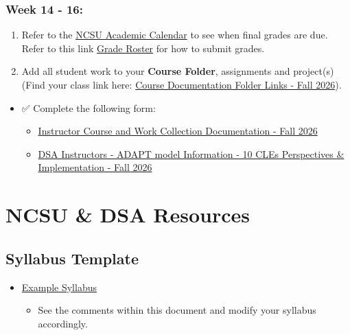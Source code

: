 \documentclass[
  letterpaper,
  DIV=11,
  numbers=noendperiod]{scrreprt}
\providecommand{\tightlist}{%
  \setlength{\itemsep}{0pt}\setlength{\parskip}{0pt}}
\begin{document}
\subsection{Week 14 - 16:}\label{week-14---16}

\begin{enumerate}
\def\labelenumi{\arabic{enumi})}
\item
  Refer to the
  \href{https://studentservices.ncsu.edu/calendars/academic/}{NCSU
  Academic Calendar} to see when final grades are due. Refer to this
  link
  \href{https://sis.emas.ncsu.edu/faculty/faculty-center/\#grades}{Grade
  Roster} for how to submit grades.
\item
  Add all student work to your \textbf{Course Folder}, assignments and
  project(s) (Find your class link here:
  \href{https://docs.google.com/spreadsheets/d/1BfmKDDVHphxg9P5aBqG5MKlu0ZaOudI4i4zswpZXQI0/edit?usp=sharing}{Course
  Documentation Folder Links - Fall 2026}).
\end{enumerate}

\begin{itemize}
\tightlist
\item
  ✅ Complete the following form:

  \begin{itemize}
  \tightlist
  \item
    \href{https://forms.gle/EZbAB9R8btpNZC5V6}{Instructor Course and
    Work Collection Documentation - Fall 2026}
  \item
    \href{https://forms.gle/ZEv9MpUCY2YeDwxn7}{DSA Instructors - ADAPT
    model Information - 10 CLEs Perspectives \& Implementation - Fall
    2026}
  \end{itemize}
\end{itemize}


\chapter{NCSU \& DSA Resources}\label{ncsu-dsa-resources}

\section{Syllabus Template}\label{syllabus-template}

\begin{itemize}
\tightlist
\item
  \href{https://docs.google.com/document/d/12w-byO3kEmP4ofI8GIuDAbXkEOA3hwqVGXz3qRbX-l4/edit?usp=sharing}{Example
  Syllabus}

  \begin{itemize}
  \tightlist
  \item
    See the comments within this document and modify your syllabus
    accordingly.
  \end{itemize}
\end{itemize}
\end{document}
